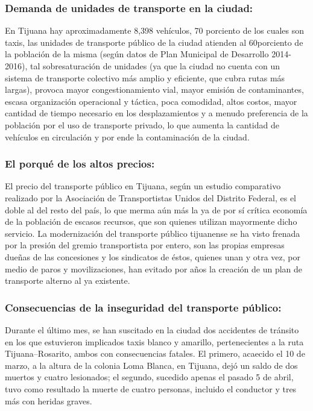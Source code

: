 \documentclass{bmcart}
\begin{document}
\subsubsection{Demanda de unidades de transporte en la ciudad:}
En Tijuana hay aproximadamente 8,398 vehículos, 70 porciento de los cuales son taxis, las unidades de transporte público de la ciudad atienden al 60porciento de la población de la misma (según datos de Plan Municipal de Desarrollo 2014-2016), tal sobresaturación de unidades (ya que la ciudad no cuenta con un sistema de transporte colectivo más amplio y eficiente, que cubra rutas más largas), provoca mayor congestionamiento vial, mayor emisión de contaminantes, escasa organización operacional y táctica, poca comodidad, altos costos, mayor cantidad de tiempo necesario en los desplazamientos y a menudo preferencia de la población por el uso de transporte privado, lo que aumenta la cantidad de vehículos en circulación y por ende la contaminación de la ciudad.

\subsubsection{El porqué de los altos precios:}
El precio del transporte público en Tijuana, según un estudio comparativo realizado por la Asociación de Transportistas Unidos del Distrito Federal, es el doble al del resto del país, lo que merma aún más la ya de por sí crítica economía de la población de escasos recursos, que son quienes utilizan mayormente dicho servicio. La modernización del transporte público tijuanense se ha visto frenada por la presión del gremio transportista por entero, son las propias empresas dueñas de las concesiones y los sindicatos de éstos, quienes unan y otra vez, por medio de paros y movilizaciones, han evitado por años la creación de un plan de transporte alterno al ya existente. 

\subsubsection{Consecuencias de la inseguridad del transporte público:}
Durante el último mes, se han suscitado en la ciudad dos accidentes de tránsito en los que estuvieron implicados taxis blanco y amarillo, pertenecientes a la ruta Tijuana–Rosarito, ambos con consecuencias fatales. El primero, acaecido el 10 de marzo, a la altura de la colonia Loma Blanca, en Tijuana, dejó un saldo de dos muertos y cuatro lesionados; el segundo, sucedido apenas el pasado 5 de abril, tuvo como resultado la muerte de cuatro personas, incluido el conductor y tres más con heridas graves.
\end{document}
